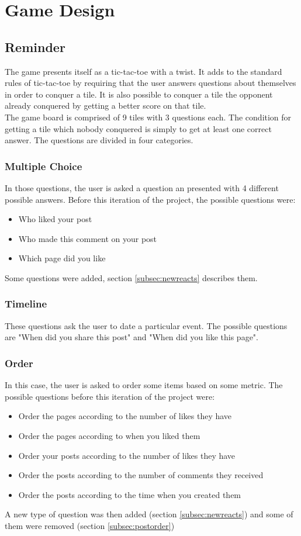 \chapter{Game Design}
\section{Reminder}
The game presents itself as a tic-tac-toe with a twist. It adds to the standard rules of tic-tac-toe by requiring that the user answers questions about themselves in order to conquer a tile. It is also possible to conquer a tile the opponent already conquered by getting a better score on that tile.\\
The game board is comprised of 9 tiles with 3 questions each. The condition for getting a tile which nobody conquered is simply to get at least one correct answer. The questions are divided in four categories.
\subsection{Multiple Choice}
In those questions, the user is asked a question an presented with 4 different possible answers. Before this iteration of the project, the possible questions were:
\begin{itemize}
	\item Who liked your post
	\item Who made this comment on your post
	\item Which page did you like
\end{itemize}
Some questions were added, section \ref{subsec:newreacts} describes them.
\subsection{Timeline}
These questions ask the user to date a particular event. The possible questions are "When did you share this post" and "When did you like this page".
\subsection{Order}
In this case, the user is asked to order some items based on some metric. The possible questions before this iteration of the project were:
\begin{itemize}
	\item Order the pages according to the number of likes they have
	\item Order the pages according to when you liked them
	\item Order your posts according to the number of likes they have
	\item Order the posts according to the number of comments they received
	\item Order the posts according to the time when you created them
\end{itemize}
A new type of question was then added (section \ref{subsec:newreacts}) and some of them were removed (section \ref{subsec:postorder})

